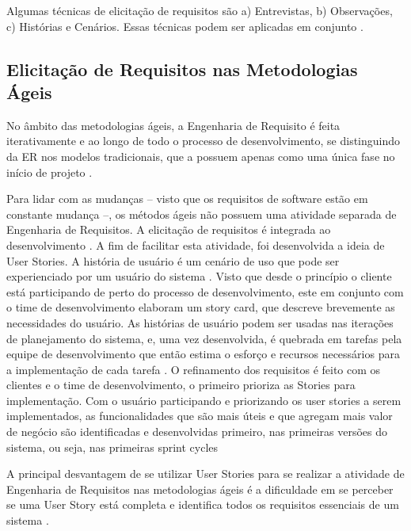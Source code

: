 Algumas técnicas de elicitação de requisitos são a) Entrevistas, b) Observações, c) Histórias e Cenários. Essas técnicas podem ser aplicadas em conjunto \cite{sommerville2015software}.

\subsection{Elicitação de Requisitos nas Metodologias Ágeis}

No âmbito das metodologias ágeis, a Engenharia de Requisito é feita iterativamente e ao longo de todo o processo de desenvolvimento, se distinguindo da ER nos modelos tradicionais, que a possuem apenas como uma única fase no início de projeto \cite{FerreiraMartins2019}.


Para lidar com as mudanças -- visto que os requisitos de software estão em constante mudança --, os métodos ágeis não possuem uma atividade separada de Engenharia de Requisitos. A elicitação de requisitos é integrada ao desenvolvimento \cite{sommerville2015software}. A fim de facilitar esta atividade, foi desenvolvida a ideia de User Stories. A história de usuário é um cenário de uso que pode ser experienciado por um usuário do sistema \cite{sommerville2015software}.
Visto que desde o princípio o cliente está participando de perto do processo de desenvolvimento, este em conjunto com o time de desenvolvimento elaboram um story card, que descreve brevemente as necessidades do usuário. As histórias de usuário podem ser usadas nas iterações de planejamento do sistema, e, uma vez desenvolvida, é quebrada em tarefas pela equipe de desenvolvimento que então estima o esforço e recursos necessários para a implementação de cada tarefa \cite{sommerville2015software}. O refinamento dos requisitos é feito com os clientes e o time de desenvolvimento, o primeiro prioriza as Stories para implementação. Com o usuário participando e priorizando os user stories a serem implementados, as funcionalidades que são mais úteis e que agregam mais valor de negócio são identificadas e desenvolvidas primeiro, nas primeiras versões do sistema, ou seja, nas primeiras sprint cycles

A principal desvantagem de se utilizar User Stories para se realizar a atividade de Engenharia de Requisitos nas metodologias ágeis é a dificuldade em se perceber se uma User Story está completa e identifica todos os requisitos essenciais de um sistema \cite{sommerville2015software}.



